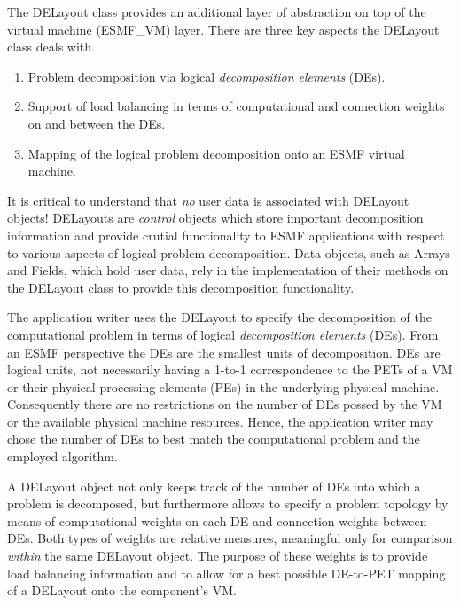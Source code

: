 
The DELayout class provides an additional layer of abstraction on top of the virtual machine (ESMF\_VM) layer. There are three key aspects the DELayout class deals with.

\begin{enumerate}

\item Problem decomposition via logical {\it decomposition elements} (DEs).

\item Support of load balancing in terms of computational and connection weights on and between the DEs. 

\item Mapping of the logical problem decomposition onto an ESMF virtual machine.

\end{enumerate}

It is critical to understand that {\it no} user data is associated with DELayout objects! DELayouts are {\it control} objects which store important decomposition information and provide crutial functionality to ESMF applications with respect to various aspects of logical problem decomposition. Data objects, such as Arrays and Fields, which hold user data, rely in the implementation of their methods on the DELayout class to provide this decomposition functionality.

The application writer uses the DELayout to specify the decomposition of the computational problem in terms of logical {\it decomposition elements} (DEs). From an ESMF perspective the DEs are the smallest units of decomposition. DEs are logical units, not necessarily having a 1-to-1 correspondence to the PETs of a VM or their physical processing elements (PEs) in the underlying physical machine. Consequently there are no restrictions on the number of DEs possed by the VM or the available physical machine resources. Hence, the application writer may chose the number of DEs to best match the computational problem and the employed algorithm.

A DELayout object not only keeps track of the number of DEs into which a problem is decomposed, but furthermore allows to specify a problem topology by means of computational weights on each DE and connection weights between DEs. Both types of weights are relative measures, meaningful only for comparison {\it within} the same DELayout object. The purpose of these weights is to provide load balancing information and to allow for a best possible DE-to-PET mapping of a DELayout onto the component's VM.

